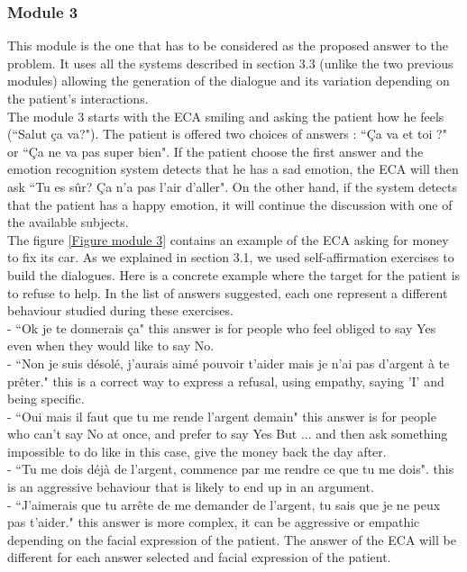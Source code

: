 \documentclass[11pt]{article}
\begin{document}
\subsubsection{Module 3}
This module is the one that has to be considered as the proposed answer to the problem. It uses all the systems described in section 3.3 (unlike the two previous modules) allowing the generation of the dialogue and its variation depending on the patient's interactions. \\

The module 3 starts with the ECA smiling and asking the patient how he feels (``Salut \c{c}a va?"). The patient is offered two choices of answers : ``\c{C}a va et toi ?" or ``\c{C}a ne va pas super bien". If the patient choose the first answer and the emotion recognition system detects that he has a sad emotion, the ECA will then ask ``Tu es s\^{u}r? \c{C}a n'a pas l'air d'aller". On the other hand, if the system detects that the patient has a happy emotion, it will continue the discussion with one of the available subjects.\\

The figure \ref{Figure module 3} contains an example of the ECA asking for money to fix its car. As we explained in section 3.1, we used self-affirmation exercises to build the dialogues. Here is a concrete example where the target for the patient is to refuse to help. In the list of answers suggested, each one represent a different behaviour studied during these exercises. \\
- ``Ok je te donnerais \c{c}a" this answer is for people who feel obliged to say Yes even when they would like to say No.\\
- ``Non je suis d\'{e}sol\'{e}, j'aurais aim\'{e} pouvoir t'aider mais je n'ai pas d'argent \`{a} te pr\^{e}ter." this is a correct way to express a refusal, using empathy, saying 'I' and being specific.\\
- ``Oui mais il faut que tu me rende l'argent demain" this answer is for people who can't say No at once, and prefer to say Yes But ... and then ask something impossible to do like in this case, give the money back the day after.\\
- ``Tu me dois d\'{e}j\`{a} de l'argent, commence par me rendre ce que tu me dois". this is an aggressive behaviour that is likely to end up in an argument.\\
- ``J'aimerais que tu arr\^{e}te de me demander de l'argent, tu sais que je ne peux pas t'aider." this answer is more complex, it can be aggressive or empathic depending on the facial expression of the patient. The answer of the ECA will be different for each answer selected and facial expression of the patient.\\
\end{document}
